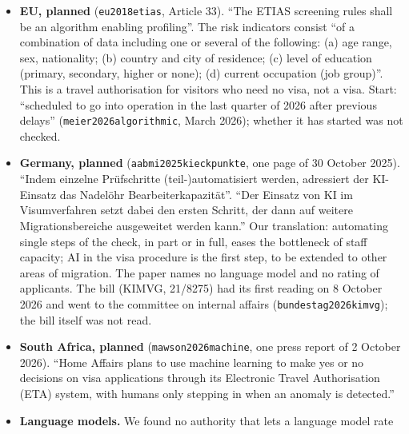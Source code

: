 \documentclass[11pt]{article}
\begin{document}
{\begin{itemize}
        produces a unitless anomaly score (0--1) for each already-adjudicated case and
        uses the score to generate a post-level ranked list that bins cases into priority
        tiers (e.g., high/medium/low) for managerial review.'' ``[I]t is not a decision
        output and is not used as an applicant risk determination.'' ``ARRE does not
        make, recommend, or change visa issuance/refusal decisions''. So this is a score
        on decided cases, not a rating of applicants.
  \item \textbf{EU, planned} (\texttt{eu2018etias}, Article 33). ``The ETIAS screening
        rules shall be an algorithm enabling profiling''. The risk indicators consist
        ``of a combination of data including one or several of the following: (a) age
        range, sex, nationality; (b) country and city of residence; (c) level of
        education (primary, secondary, higher or none); (d) current occupation (job
        group)''. This is a travel authorisation for visitors who need no visa, not a
        visa. Start: ``scheduled to go into operation in the last quarter of 2026 after
        previous delays'' (\texttt{meier2026algorithmic}, March 2026); whether it has
        started was not checked.
  \item \textbf{Germany, planned} (\texttt{aabmi2025kieckpunkte}, one page of 30 October
        2025). ``Indem einzelne Pr\"ufschritte (teil-)automatisiert werden, adressiert
        der KI-Einsatz das Nadel\"ohr Bearbeiterkapazit\"at''. ``Der Einsatz von KI im
        Visumverfahren setzt dabei den ersten Schritt, der dann auf weitere
        Migrationsbereiche ausgeweitet werden kann.'' Our translation: automating single
        steps of the check, in part or in full, eases the bottleneck of staff capacity;
        AI in the visa procedure is the first step, to be extended to other areas of
        migration. The paper names no language model and no rating of applicants. The
        bill (KIMVG, 21/8275) had its first reading on 8 October 2026 and went to the
        committee on internal affairs (\texttt{bundestag2026kimvg}); the bill itself was
        not read.
  \item \textbf{South Africa, planned} (\texttt{mawson2026machine}, one press report of
        2 October 2026). ``Home Affairs plans to use machine learning to make yes or no
        decisions on visa applications through its Electronic Travel Authorisation (ETA)
        system, with humans only stepping in when an anomaly is detected.''
  \item \textbf{Language models.} We found no authority that lets a language model rate

\end{itemize}}
\end{document}
